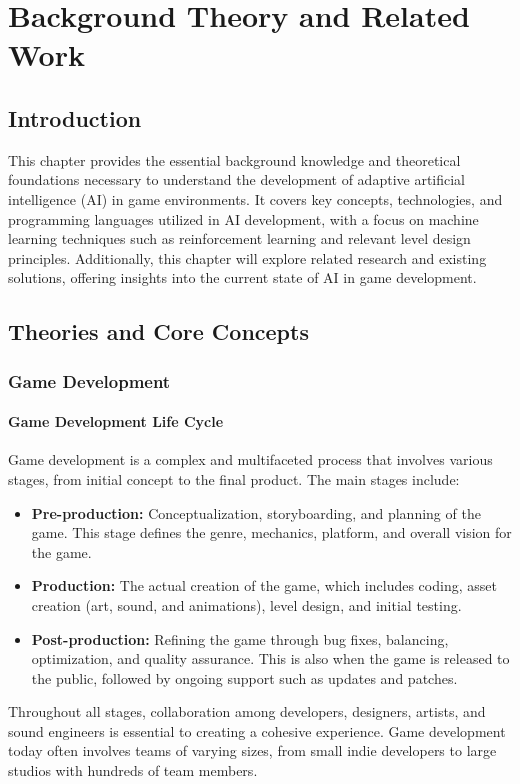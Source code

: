 \documentclass[12pt,oneside,openright,a4paper]{cpe-english-project}
\begin{document}
\chapter{Background Theory and Related Work}
\section{Introduction}
This chapter provides the essential background knowledge and theoretical foundations necessary to understand the development of adaptive artificial intelligence (AI) in game environments. It covers key concepts, technologies, and programming languages utilized in AI development, with a focus on machine learning techniques such as reinforcement learning and relevant level design principles. Additionally, this chapter will explore related research and existing solutions, offering insights into the current state of AI in game development.


\section{Theories and Core Concepts}
\subsection{Game Development}
\subsubsection{Game Development Life Cycle}
Game development is a complex and multifaceted process that involves various stages, from initial concept to the final product. The main stages include:
\begin{itemize}
\item  \textbf{Pre-production:} Conceptualization, storyboarding, and planning of the game. This stage defines the genre, mechanics, platform, and overall vision for the game.
\item  \textbf{Production:} The actual creation of the game, which includes coding, asset creation (art, sound, and animations), level design, and initial testing.
\item  \textbf{Post-production:} Refining the game through bug fixes, balancing, optimization, and quality assurance. This is also when the game is released to the public, followed by ongoing support such as updates and patches.
\end{itemize}
Throughout all stages, collaboration among developers, designers, artists, and sound engineers is essential to creating a cohesive experience. Game development today often involves teams of varying sizes, from small indie developers to large studios with hundreds of team members.
\end{document}
